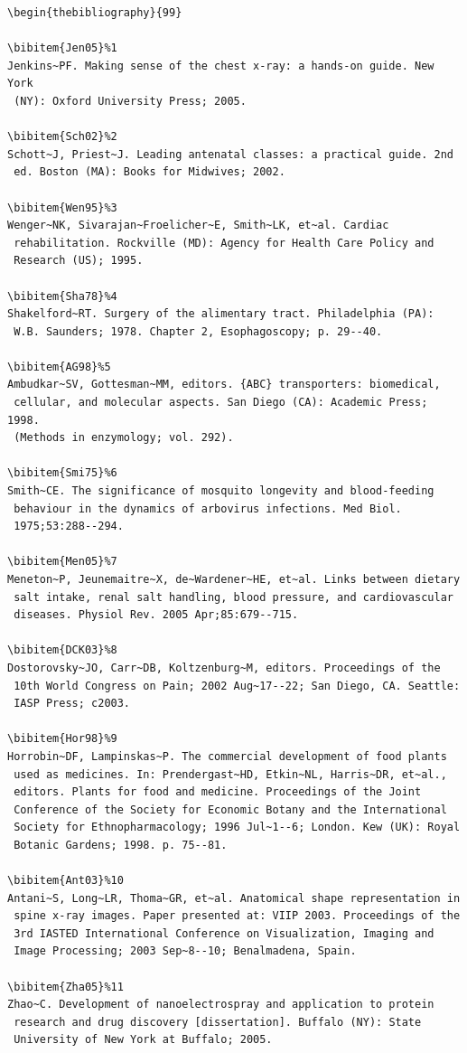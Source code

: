 \documentclass[]{interact}
\theoremstyle{plain}%
\theoremstyle{definition}
\theoremstyle{remark}
\begin{document}
\begin{verbatim}
\begin{thebibliography}{99}

\bibitem{Jen05}%1
Jenkins~PF. Making sense of the chest x-ray: a hands-on guide. New York
 (NY): Oxford University Press; 2005.

\bibitem{Sch02}%2
Schott~J, Priest~J. Leading antenatal classes: a practical guide. 2nd
 ed. Boston (MA): Books for Midwives; 2002.

\bibitem{Wen95}%3
Wenger~NK, Sivarajan~Froelicher~E, Smith~LK, et~al. Cardiac
 rehabilitation. Rockville (MD): Agency for Health Care Policy and
 Research (US); 1995.

\bibitem{Sha78}%4
Shakelford~RT. Surgery of the alimentary tract. Philadelphia (PA):
 W.B. Saunders; 1978. Chapter 2, Esophagoscopy; p. 29--40.

\bibitem{AG98}%5
Ambudkar~SV, Gottesman~MM, editors. {ABC} transporters: biomedical,
 cellular, and molecular aspects. San Diego (CA): Academic Press; 1998.
 (Methods in enzymology; vol. 292).

\bibitem{Smi75}%6
Smith~CE. The significance of mosquito longevity and blood-feeding
 behaviour in the dynamics of arbovirus infections. Med Biol.
 1975;53:288--294.

\bibitem{Men05}%7
Meneton~P, Jeunemaitre~X, de~Wardener~HE, et~al. Links between dietary
 salt intake, renal salt handling, blood pressure, and cardiovascular
 diseases. Physiol Rev. 2005 Apr;85:679--715.

\bibitem{DCK03}%8
Dostorovsky~JO, Carr~DB, Koltzenburg~M, editors. Proceedings of the
 10th World Congress on Pain; 2002 Aug~17--22; San Diego, CA. Seattle:
 IASP Press; c2003.

\bibitem{Hor98}%9
Horrobin~DF, Lampinskas~P. The commercial development of food plants
 used as medicines. In: Prendergast~HD, Etkin~NL, Harris~DR, et~al.,
 editors. Plants for food and medicine. Proceedings of the Joint
 Conference of the Society for Economic Botany and the International
 Society for Ethnopharmacology; 1996 Jul~1--6; London. Kew (UK): Royal
 Botanic Gardens; 1998. p. 75--81.

\bibitem{Ant03}%10
Antani~S, Long~LR, Thoma~GR, et~al. Anatomical shape representation in
 spine x-ray images. Paper presented at: VIIP 2003. Proceedings of the
 3rd IASTED International Conference on Visualization, Imaging and
 Image Processing; 2003 Sep~8--10; Benalmadena, Spain.

\bibitem{Zha05}%11
Zhao~C. Development of nanoelectrospray and application to protein
 research and drug discovery [dissertation]. Buffalo (NY): State
 University of New York at Buffalo; 2005.


\end{verbatim}
\end{document}
